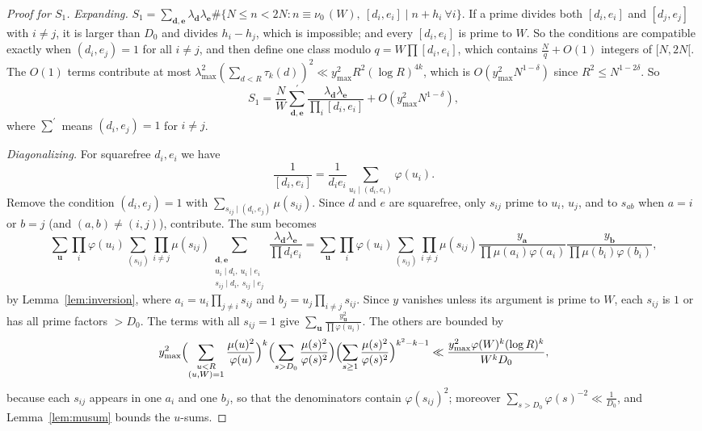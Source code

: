 \begin{proof}[Proof for $S_1$]
\emph{Expanding.} $S_1=\sum_{\mathbf d,\mathbf e}\lambda_{\mathbf d}\lambda_{\mathbf e}\#\{N\le n<2N:n\equiv\nu_0\,(W),\ [d_i,e_i]\mid n+h_i\ \forall i\}$. If a prime divides both $[d_i,e_i]$ and $[d_j,e_j]$ with $i\ne j$, it is larger than $D_0$ and divides $h_i-h_j$, which is impossible; and every $[d_i,e_i]$ is prime to $W$. So the conditions are compatible exactly when $(d_i,e_j)=1$ for all $i\ne j$, and then define one class modulo $q=W\prod[d_i,e_i]$, which contains $\frac Nq+O(1)$ integers of $[N,2N[$. The $O(1)$ terms contribute at most $\lambda_{\max}^2(\sum_{d<R}\tau_k(d))^2\ll y_{\max}^2R^2(\log R)^{4k}$, which is $O(y_{\max}^2N^{1-\delta})$ since $R^2\le N^{1-2\delta}$. So
\[
S_1=\frac NW\sum^{\prime}_{\mathbf d,\mathbf e}\frac{\lambda_{\mathbf d}\lambda_{\mathbf e}}{\prod_i[d_i,e_i]}+O(y_{\max}^2N^{1-\delta}),
\]
where $\sum^{\prime}$ means $(d_i,e_j)=1$ for $i\ne j$.

\emph{Diagonalizing.} For squarefree $d_i,e_i$ we have
\[
\frac1{[d_i,e_i]}=\frac1{d_ie_i}\sum_{u_i\mid(d_i,e_i)}\varphi(u_i).
\]
Remove the condition $(d_i,e_j)=1$ with $\sum_{s_{ij}\mid(d_i,e_j)}\mu(s_{ij})$. Since $d$ and $e$ are squarefree, only $s_{ij}$ prime to $u_i$, $u_j$, and to $s_{ab}$ when $a=i$ or $b=j$ (and $(a,b)\ne(i,j)$), contribute. The sum becomes
\[
\sum_{\mathbf u}\prod_i\varphi(u_i)\sum_{(s_{ij})}\prod_{i\ne j}\mu(s_{ij})\sum_{\substack{\mathbf d,\mathbf e\\u_i\mid d_i,\ u_i\mid e_i\\s_{ij}\mid d_i,\ s_{ij}\mid e_j}}\frac{\lambda_{\mathbf d}\lambda_{\mathbf e}}{\prod d_ie_i}=\sum_{\mathbf u}\prod_i\varphi(u_i)\sum_{(s_{ij})}\prod_{i\ne j}\mu(s_{ij})\frac{y_{\mathbf a}}{\prod\mu(a_i)\varphi(a_i)}\frac{y_{\mathbf b}}{\prod\mu(b_i)\varphi(b_i)},
\]
by Lemma~\ref{lem:inversion}, where $a_i=u_i\prod_{j\ne i}s_{ij}$ and $b_j=u_j\prod_{i\ne j}s_{ij}$. Since $y$ vanishes unless its argument is prime to $W$, each $s_{ij}$ is $1$ or has all prime factors $>D_0$. The terms with all $s_{ij}=1$ give $\sum_{\mathbf u}\frac{y_{\mathbf u}^2}{\prod\varphi(u_i)}$. The others are bounded by
\[
y_{\max}^2\Bigl(\sum_{\substack{u<R\\(u,W)=1}}\frac{\mu(u)^2}{\varphi(u)}\Bigr)^k\Bigl(\sum_{s>D_0}\frac{\mu(s)^2}{\varphi(s)^2}\Bigr)\Bigl(\sum_{s\ge1}\frac{\mu(s)^2}{\varphi(s)^2}\Bigr)^{k^2-k-1}\ll\frac{y_{\max}^2\varphi(W)^k(\log R)^k}{W^kD_0},
\]
because each $s_{ij}$ appears in one $a_i$ and one $b_j$, so that the denominators contain $\varphi(s_{ij})^2$; moreover $\sum_{s>D_0}\varphi(s)^{-2}\ll\frac1{D_0}$, and Lemma~\ref{lem:musum} bounds the $u$-sums.


\end{proof}
